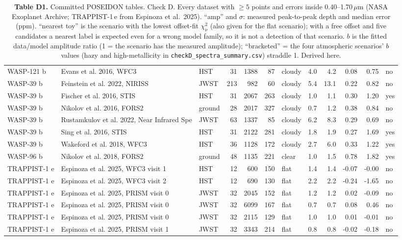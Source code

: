 \begin{table}[H]
\begin{tabular}{@{}lllrrrlrrrrl@{}}
WASP-121 b & Evans et al. 2016, WFC3 & HST & 31 & 1388 & 87 & cloudy & 4.0 & 4.2 & 0.08 & 0.75 & no \\
WASP-39 b & Feinstein et al. 2022, NIRISS & JWST & 213 & 982 & 60 & cloudy & 5.4 & 13.1 & 0.22 & 0.82 & no \\
WASP-39 b & Fischer et al. 2016, STIS & HST & 31 & 2067 & 263 & cloudy & 1.0 & 1.1 & 0.30 & 1.20 & yes \\
WASP-39 b & Nikolov et al. 2016, FORS2 & ground & 28 & 2017 & 327 & cloudy & 0.7 & 1.2 & 0.38 & 0.84 & no \\
WASP-39 b & Rustamkulov et al. 2022, Near Infrared Spe & JWST & 63 & 1337 & 85 & cloudy & 6.2 & 8.3 & 0.29 & 0.69 & no \\
WASP-39 b & Sing et al. 2016, STIS & HST & 31 & 2122 & 281 & cloudy & 1.8 & 1.9 & 0.27 & 1.69 & yes \\
WASP-39 b & Wakeford et al. 2018, WFC3 & HST & 36 & 1128 & 172 & cloudy & 2.7 & 6.0 & 0.33 & 1.22 & yes \\
WASP-96 b & Nikolov et al. 2018, FORS2 & ground & 48 & 1135 & 221 & clear & 1.0 & 1.5 & 0.78 & 1.82 & yes \\
TRAPPIST-1 e & Espinoza et al. 2025, WFC3 visit 1 & HST & 12 & 600 & 150 & flat & 1.4 & 1.4 & -0.07 & -0.00 & no \\
TRAPPIST-1 e & Espinoza et al. 2025, WFC3 visit 2 & HST & 12 & 690 & 130 & flat & 2.2 & 2.2 & -0.24 & -1.65 & no \\
TRAPPIST-1 e & Espinoza et al. 2025, PRISM visit 0 & JWST & 32 & 2045 & 152 & flat & 1.2 & 1.2 & 0.02 & -0.09 & no \\
TRAPPIST-1 e & Espinoza et al. 2025, PRISM visit 0 & JWST & 32 & 6099 & 167 & flat & 0.7 & 0.7 & 0.08 & 0.46 & no \\
TRAPPIST-1 e & Espinoza et al. 2025, PRISM visit 0 & JWST & 32 & 2115 & 129 & flat & 1.0 & 1.0 & 0.01 & -0.01 & no \\
TRAPPIST-1 e & Espinoza et al. 2025, PRISM visit 1 & JWST & 32 & 3343 & 214 & flat & 0.8 & 0.8 & -0.02 & -0.18 & no \\
\bottomrule
\end{tabular}
\caption*{\footnotesize\textbf{Table D1.} Committed POSEIDON tables. Check D. Every dataset with $\ge 5$ points and errors inside 0.40--1.70\,$\mu$m (NASA Exoplanet Archive; TRAPPIST-1\,e from Espinoza et al.\ 2025). ``amp'' and $\sigma$: measured peak-to-peak depth and median error (ppm). ``nearest toy'' is the scenario with the lowest offset-fit $\chi^2_\nu$ (also given for the flat scenario); with a free offset and five candidates a nearest label is expected even for a wrong model family, so it is not a detection of that scenario. $b$ is the fitted data/model amplitude ratio (1 = the scenario has the measured amplitude); ``bracketed'' = the four atmospheric scenarios' $b$ values (hazy and high-metallicity in \texttt{checkD\_spectra\_summary.csv}) straddle 1. Derived here.}
\end{table}
